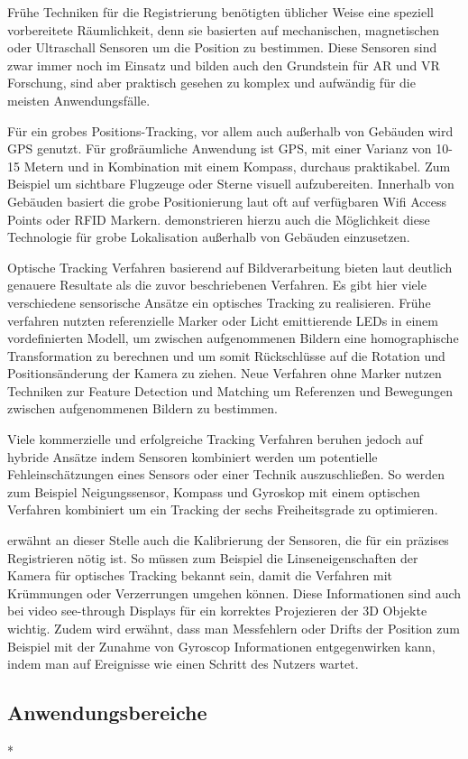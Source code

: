 Frühe Techniken für die Registrierung benötigten üblicher Weise eine speziell vorbereitete Räumlichkeit, denn sie basierten auf mechanischen, magnetischen oder Ultraschall Sensoren um die Position zu bestimmen. Diese Sensoren sind zwar immer noch im Einsatz und bilden auch den Grundstein für AR und VR Forschung, sind aber praktisch gesehen zu komplex und aufwändig für die meisten Anwendungsfälle. \citep{van2010survey} 

Für ein grobes Positions-Tracking, vor allem auch außerhalb von Gebäuden wird GPS genutzt. Für großräumliche Anwendung ist GPS, mit einer Varianz von 10-15 Metern und in Kombination mit einem Kompass, durchaus praktikabel. Zum Beispiel um sichtbare Flugzeuge oder Sterne visuell aufzubereiten. Innerhalb von Gebäuden basiert die grobe Positionierung laut \citet{van2010survey} oft auf verfügbaren Wifi Access Points oder RFID Markern. \citet{lamarca2005place} demonstrieren hierzu auch die Möglichkeit diese Technologie für grobe Lokalisation außerhalb von Gebäuden einzusetzen.

Optische Tracking Verfahren basierend auf Bildverarbeitung bieten laut \citet{van2010survey} deutlich genauere Resultate als die zuvor beschriebenen Verfahren. Es gibt hier viele verschiedene sensorische Ansätze ein optisches Tracking zu realisieren. Frühe verfahren nutzten referenzielle Marker oder Licht emittierende LEDs in einem vordefinierten Modell, um zwischen aufgenommenen Bildern eine homographische Transformation zu berechnen und um somit Rückschlüsse auf die Rotation und Positionsänderung der Kamera zu ziehen. Neue Verfahren ohne Marker nutzen Techniken zur Feature Detection und Matching um Referenzen und Bewegungen zwischen aufgenommenen Bildern zu bestimmen.

Viele kommerzielle und erfolgreiche Tracking Verfahren beruhen jedoch auf hybride Ansätze indem Sensoren kombiniert werden um potentielle Fehleinschätzungen eines Sensors oder einer Technik auszuschließen. So werden zum Beispiel Neigungssensor, Kompass und Gyroskop mit einem optischen Verfahren kombiniert um ein Tracking der sechs Freiheitsgrade zu optimieren. \citep{van2010survey}

\citet{azuma2001recent} erwähnt an dieser Stelle auch die Kalibrierung der Sensoren, die für ein präzises Registrieren nötig ist. So müssen zum Beispiel die Linseneigenschaften der Kamera für optisches Tracking bekannt sein, damit die Verfahren mit Krümmungen oder Verzerrungen umgehen können. Diese Informationen sind auch bei video see-through Displays für ein korrektes Projezieren der 3D Objekte wichtig. Zudem wird erwähnt, dass man Messfehlern oder Drifts der Position zum Beispiel mit der Zunahme von Gyroscop Informationen entgegenwirken kann, indem man auf Ereignisse wie einen Schritt des Nutzers wartet. \citep{azuma2001recent}

\subsection{Anwendungsbereiche}

* 